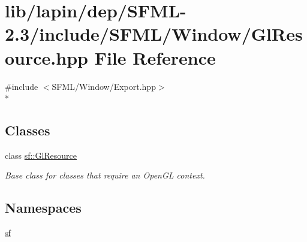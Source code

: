\hypertarget{lapin_2dep_2_s_f_m_l-2_83_2include_2_s_f_m_l_2_window_2_gl_resource_8hpp}{\section{lib/lapin/dep/\-S\-F\-M\-L-\/2.3/include/\-S\-F\-M\-L/\-Window/\-Gl\-Resource.hpp File Reference}
\label{lapin_2dep_2_s_f_m_l-2_83_2include_2_s_f_m_l_2_window_2_gl_resource_8hpp}
}
{\ttfamily \#include $<$S\-F\-M\-L/\-Window/\-Export.\-hpp$>$}\\*
\subsection*{Classes}
\begin{DoxyCompactItemize}
\item 
class \hyperlink{classsf_1_1_gl_resource}{sf\-::\-Gl\-Resource}
\begin{DoxyCompactList}\small\item\em Base class for classes that require an Open\-G\-L context. \end{DoxyCompactList}\end{DoxyCompactItemize}
\subsection*{Namespaces}
\begin{DoxyCompactItemize}
\item 
\hyperlink{namespacesf}{sf}
\end{DoxyCompactItemize}

